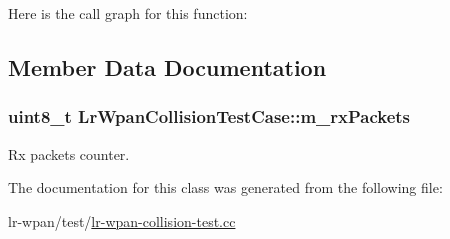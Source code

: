 Here is the call graph for this function\+:




\subsection{Member Data Documentation}
\subsubsection[{\texorpdfstring{m\+\_\+rx\+Packets}{m_rxPackets}}]{\setlength{\rightskip}{0pt plus 5cm}uint8\+\_\+t Lr\+Wpan\+Collision\+Test\+Case\+::m\+\_\+rx\+Packets\hspace{0.3cm}{\ttfamily [private]}}\hypertarget{classLrWpanCollisionTestCase_a99c5c25759f67c884349444a74a86186}{}\label{classLrWpanCollisionTestCase_a99c5c25759f67c884349444a74a86186}


Rx packets counter. 



The documentation for this class was generated from the following file\+:\begin{DoxyCompactItemize}
\item 
lr-\/wpan/test/\hyperlink{lr-wpan-collision-test_8cc}{lr-\/wpan-\/collision-\/test.\+cc}\end{DoxyCompactItemize}
